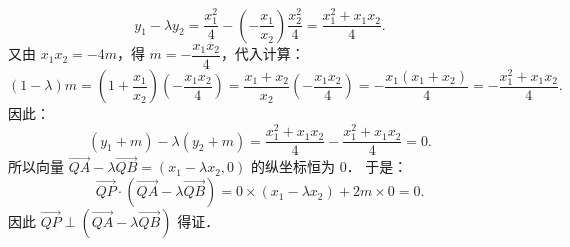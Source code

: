 \begin{answer}
\nopagebreak[4]
\[
y_1 - \lambda y_2 = \frac{x_1^2}{4} - \left(-\frac{x_1}{x_2}\right)\frac{x_2^2}{4} = \frac{x_1^2 + x_1 x_2}{4}.
\]
又由 $x_1 x_2 = -4m$，得 $m = -\dfrac{x_1 x_2}{4}$，代入计算：
\nopagebreak[4]
\[
(1 - \lambda)m = \left(1 + \frac{x_1}{x_2}\right)\left(-\frac{x_1 x_2}{4}\right) = \frac{x_1 + x_2}{x_2}\left(-\frac{x_1 x_2}{4}\right) = -\frac{x_1(x_1 + x_2)}{4} = -\frac{x_1^2 + x_1 x_2}{4}.
\]
因此：
\nopagebreak[4]
\[
(y_1 + m) - \lambda(y_2 + m) = \frac{x_1^2 + x_1 x_2}{4} - \frac{x_1^2 + x_1 x_2}{4} = 0.
\]
所以向量 $\vec{QA} - \lambda\vec{QB} = (x_1 - \lambda x_2, 0)$ 的纵坐标恒为 $0$．
于是：
\nopagebreak[4]
\[
\vec{QP} \cdot (\vec{QA} - \lambda\vec{QB}) = 0 \times (x_1 - \lambda x_2) + 2m \times 0 = 0.
\]
因此 $\vec{QP} \perp (\vec{QA} - \lambda\vec{QB})$ 得证．


\end{answer}
